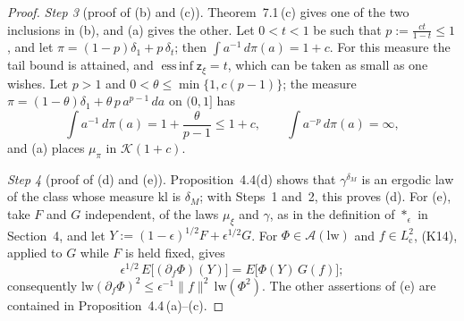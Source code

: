 \documentclass[11pt]{amsart}
\theoremstyle{definition}
\begin{document}
\begin{proof}
\emph{Step 3} (proof of (b) and (c)).
Theorem~7.1\,(c) gives one of the two inclusions in (b), and (a) gives the other.
Let $0<t<1$ be such that $p:=\frac{ct}{1-t}\le1$,
and let $\pi=(1-p)\delta_1+p\,\delta_t$;
then $\int a^{-1}\,d\pi(a)=1+c$.
For this measure the tail bound is attained,
and $\operatorname{ess\,inf}\mathsf z_\xi=t$, which can be taken as small as one wishes.
Let $p>1$ and $0<\theta\le\min\{1,c(p-1)\}$;
the measure $\pi=(1-\theta)\delta_1+\theta\,p\,a^{p-1}\,da$ on $(0,1]$ has
\begin{equation*}
\int a^{-1}\,d\pi(a)=1+\frac{\theta}{p-1}\le1+c,\qquad\int a^{-p}\,d\pi(a)=\infty,
\end{equation*}
and (a) places $\mu_\pi$ in $\mathcal K(1+c)$.

\emph{Step 4} (proof of (d) and (e)).
Proposition~4.4(d) shows that $\gamma^{\delta_M}$ is an ergodic law of the class whose measure $\mathrm{kl}$ is $\delta_M$;
with Steps~1 and~2, this proves (d).
For (e), take $F$ and $G$ independent, of the laws $\mu_\xi$ and $\gamma$, as in the definition of $\ast_\epsilon$ in Section~4,
and let $Y:=(1-\epsilon)^{1/2}F+\epsilon^{1/2}G$.
For $\Phi\in\mathcal A(\mathrm{lw})$ and $f\in L^2_{\mathrm c}$, (K14), applied to $G$ while $F$ is held fixed, gives
\begin{equation*}
\epsilon^{1/2}\,E\bigl[(\partial_f\Phi)(Y)\bigr]=E\bigl[\Phi(Y)\,G(f)\bigr];
\end{equation*}
consequently $\mathrm{lw}(\partial_f\Phi)^2\le\epsilon^{-1}\|f\|^2\,\allowbreak \mathrm{lw}(\Phi^2)$.
The other assertions of (e) are contained in Proposition~4.4\,(a)--(c).
\end{proof}
\end{document}
